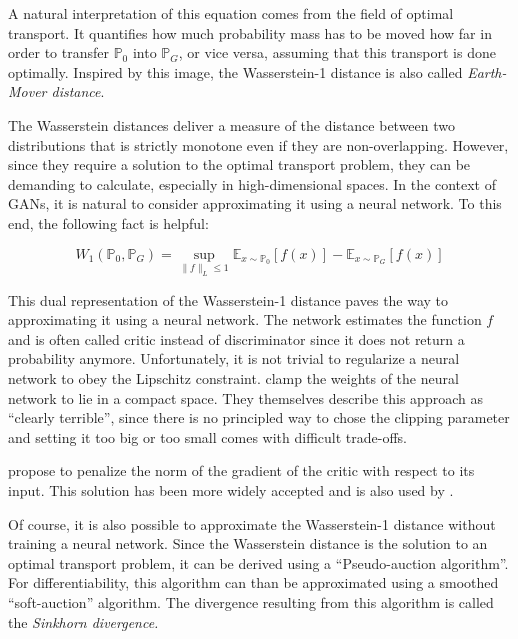 A natural interpretation of this equation comes from the field of optimal transport.
It quantifies how much probability mass has to be moved how far in order to transfer $\mathbb{P}_0$ into $\mathbb{P}_G$, or vice versa, assuming that this transport is done optimally.
Inspired by this image, the Wasserstein-1 distance is also called \textit{Earth-Mover distance}.

The Wasserstein distances deliver a measure of the distance between two distributions that is strictly monotone even if they are non-overlapping. %
However, since they require a solution to the optimal transport problem, they can be demanding to calculate, especially in high-dimensional spaces. %
In the context of GANs, it is natural to consider approximating it using a neural network.
To this end, the following fact is helpful:

\begin{theorem}
    \begin{equation}
        W_{1}\left(\mathbb{P}_0, \mathbb{P}_G\right)=\sup _{\|f\|_L \leq 1} \mathbb{E}_{x \sim \mathbb{P}_0}[f(x)]-\mathbb{E}_{x \sim \mathbb{P}_G}[f(x)]
    \end{equation}
\end{theorem}

This dual representation of the Wasserstein-1 distance paves the way to approximating it using a neural network.
The network estimates the function $f$ and is often called critic instead of discriminator since it does not return a probability anymore.
Unfortunately, it is not trivial to regularize a neural network to obey the Lipschitz constraint.
\Textcite{arjovsky2017wassersteingan} clamp the weights of the neural network to lie in a compact space.
They themselves describe this approach as ``clearly terrible'', since there is no principled way to chose the clipping parameter and setting it too big or too small comes with difficult trade-offs. %

\Textcite{gulrajani2017improvedtrainingwassersteingans} propose to penalize the norm of the gradient of the critic with respect to its input.
This solution has been more widely accepted and is also used by \textcite{athey2021using}.

Of course, it is also possible to approximate the Wasserstein-1 distance without training a neural network.
Since the Wasserstein distance is the solution to an optimal transport problem, it can be derived using a ``Pseudo-auction algorithm''.
For differentiability, this algorithm can than be approximated using a smoothed ``soft-auction'' algorithm.
The divergence resulting from this algorithm is called the \textit{Sinkhorn divergence.} %

